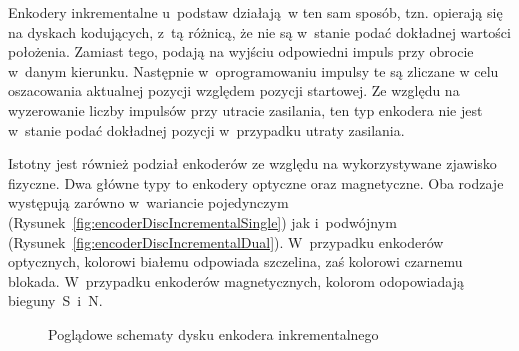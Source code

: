 Enkodery inkrementalne u~podstaw działają~w ten sam sposób, tzn. opierają się na dyskach kodujących, z~tą różnicą, że nie są w~stanie podać dokładnej wartości położenia. Zamiast tego, podają na wyjściu odpowiedni impuls przy obrocie w~danym kierunku. Następnie w~oprogramowaniu impulsy te są zliczane w celu oszacowania aktualnej pozycji względem pozycji startowej. Ze względu na wyzerowanie liczby impulsów przy utracie zasilania, ten typ enkodera nie jest w~stanie podać dokładnej pozycji w~przypadku utraty zasilania.

Istotny jest również podział enkoderów ze względu na wykorzystywane zjawisko fizyczne. Dwa główne typy to enkodery optyczne oraz magnetyczne. Oba rodzaje występują zarówno w~wariancie pojedynczym (Rysunek~\ref{fig:encoderDiscIncrementalSingle}) jak i~podwójnym (Rysunek~\ref{fig:encoderDiscIncrementalDual}). W~przypadku enkoderów optycznych, kolorowi białemu odpowiada szczelina, zaś kolorowi czarnemu blokada. W~przypadku enkoderów magnetycznych, kolorom odopowiadają bieguny~S~i~N.

\begin{figure}
    \centering
    \qquad
    \caption{Poglądowe schematy dysku enkodera inkrementalnego \cite{bib:tarczeenkoderowinkrementalnych}}
\end{figure}

